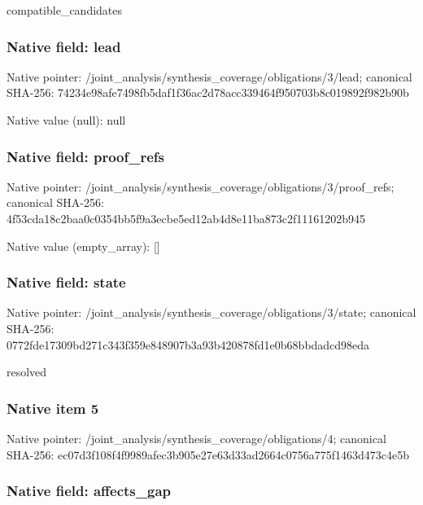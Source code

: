\documentclass[10pt,a4paper]{article}
\begin{document}
compatible\_candidates


\subsubsection{Native field: lead}


Native pointer: /joint\_analysis/synthesi\allowbreak{}s\_coverage/obligations/3\allowbreak{}/lead; canonical SHA-256: 74234e98afe7498fb5daf1f3\allowbreak{}6ac2d78acc339464f950703b\allowbreak{}8c019892f982b90b



Native value (null): null



\subsubsection{Native field: proof\_refs}


Native pointer: /joint\_analysis/synthesi\allowbreak{}s\_coverage/obligations/3\allowbreak{}/proof\_refs; canonical SHA-256: 4f53cda18c2baa0c0354bb5f\allowbreak{}9a3ecbe5ed12ab4d8e11ba87\allowbreak{}3c2f11161202b945



Native value (empty\_array): []



\subsubsection{Native field: state}


Native pointer: /joint\_analysis/synthesi\allowbreak{}s\_coverage/obligations/3\allowbreak{}/state; canonical SHA-256: 0772fde17309bd271c343f35\allowbreak{}9e848907b3a93b420878fd1e\allowbreak{}0b68bbdadcd98eda


resolved


\subsubsection{Native item 5}


Native pointer: /joint\_analysis/synthesi\allowbreak{}s\_coverage/obligations/4; canonical SHA-256: ec07d3f108f4f9989afec3b9\allowbreak{}05e27e63d33ad2664c0756a7\allowbreak{}75f1463d473c4e5b



\subsubsection{Native field: affects\_gap}
\end{document}
